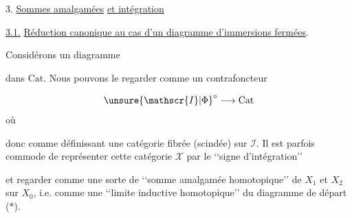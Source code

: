 3. \uline{Sommes amalgamées} \uline{et intégration}


\uline{3.1.} \uline{Réduction canonique au cas d'un diagramme d'immersions  fermées}.

Considérons un diagramme

dans $\mathrm{Cat}$. Nous pouvons le regarder comme un contrafoncteur

\[
\unsure{\mathscr{I}|\Phi}^{\circ}\longrightarrow\mathrm{Cat}
\]
où

donc comme définissant une catégorie fibrée (scindée)  sur $\mathscr{I}$. Il est parfois commode de représenter cette catégorie $\mathscr{X}$ par le \lq\lq signe d'intégration\rq\rq

et  regarder comme une sorte de \lq\lq somme amalgamée homotopique\rq\rq{} de $X_1$ et $X_2$ sur $X_0$, i.e. comme une \lq\lq limite inductive homotopique\rq\rq{} du diagramme de départ ($*$).
